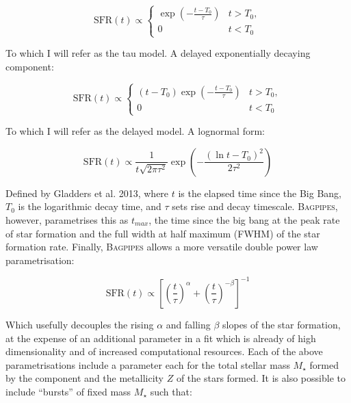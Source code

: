 \documentclass[a4paper,12pt]{article}
\begin{document}
\begin{equation}\label{eq:tau_model}
  \mathrm{SFR}(t) \propto
  \begin{cases}
    \exp\left({-\frac{t-T_0}{\tau}}\right) & t > T_0, \\
    0 & t < T_0
  \end{cases}
\end{equation}

\noindent To which I will refer as the tau model. A delayed exponentially
decaying component:

\begin{equation}\label{eq:delayed_model}
  \mathrm{SFR}(t) \propto
  \begin{cases}
    (t-T_0)\exp\left({-\frac{t-T_0}{\tau}}\right) & t > T_0, \\
    0 & t < T_0
  \end{cases}
\end{equation}

\noindent To which I will refer as the delayed model. A lognormal form:

\begin{equation}\label{eq:lognormal_model}
  \mathrm{SFR}(t) \propto
  \frac{1}{t\sqrt{2\pi\tau^2}}
  \exp\left({-\frac{\left(\ln{t-T_0}\right)^2}{2\tau^2}}\right)
\end{equation}

\noindent Defined by Gladders et al. 2013, where $t$ is the elapsed time since
the Big Bang, $T_0$ is the logarithmic decay time, and $\tau$ sets rise and
decay timescale.\cite{Gladders_2013} \textsc{Bagpipes}, however, parametrises
this as $t_{max}$, the time since the big bang at the peak rate of star
formation and the full width at half maximum (FWHM) of the star formation
rate.\cite{Carnall_2019b} Finally, \textsc{Bagpipes} allows a more versatile
double power law parametrisation:

\begin{equation}\label{eq:dblplaw_model}
  \mathrm{SFR}(t)\propto
  \left[
  \left(\frac{t}{\tau}\right)^{\alpha} +
  \left(\frac{t}{\tau}\right)^{-\beta}
  \right]
  ^{-1}
\end{equation}

\noindent Which usefully decouples the rising $\alpha$ and falling $\beta$
slopes of the star formation, at the expense of an additional parameter in a
fit which is already of high dimensionality and of increased computational
resources.\cite{Carnall_2018} Each of the above parametrisations include a
parameter each for the total stellar mass $M_\star$ formed by the component and
the metallicity $Z$ of the stars formed. It is also possible to include
``bursts'' of fixed mass $M_\star$ such that:
\end{document}
